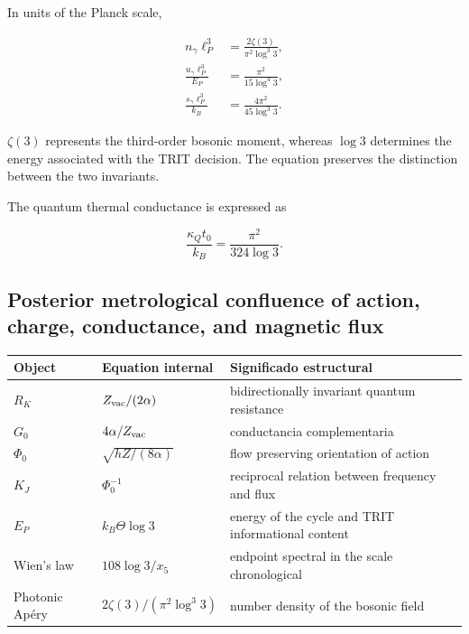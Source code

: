 In units of the Planck scale,

\begin{align}
n_\gamma\ell_P^3
&=\frac{2\zeta(3)}{\pi^2\log^3 3},
\label{p12-83-c13-s2:eq:photon-number}\\
\frac{u_\gamma\ell_P^3}{E_P}
&=\frac{\pi^2}{15\log^4 3},
\label{p12-83-c13-s2:eq:photon-energy}\\
\frac{s_\gamma\ell_P^3}{k_B}
&=\frac{4\pi^2}{45\log^3 3}.
\label{p12-83-c13-s2:eq:photon-entropy}
\end{align}

\(\zeta(3)\) represents the third-order bosonic moment, whereas
\(\log3\) determines the energy associated with the TRIT decision. The equation preserves the
distinction between the two invariants.

The quantum thermal conductance is expressed as

\begin{equation}
\frac{\kappa_Qt_0}{k_B}=\frac{\pi^2}{324\log3}.
\label{p12-83-c13-s2:eq:thermal-conductance}
\end{equation}

\subsection{Posterior metrological confluence of action, charge, conductance, and magnetic flux}

\begin{longtable}{@{}p{}p{}p{}@{}}
\toprule
Object & Equation internal & Significado estructural\\
\midrule
\endhead
\(R_K\) & \(Z_{\rm vac}/(2\alpha)\) & bidirectionally invariant quantum resistance\\
\(G_0\) & \(4\alpha/Z_{\rm vac}\) & conductancia complementaria\\
\(\Phi_0\) & \(\sqrt{hZ/(8\alpha)}\) & flow preserving orientation of action\\
\(K_J\) & \(\Phi_0^{-1}\) & reciprocal relation between frequency and flux\\
\(E_P\) & \(k_B\Theta\log3\) & energy of the cycle and TRIT informational content\\
Wien's law & \(108\log3/x_5\) & endpoint spectral in the scale chronological\\
Photonic Apéry & \(2\zeta(3)/(\pi^2\log^3 3)\) & number density of the bosonic field\\
\bottomrule
\end{longtable}


